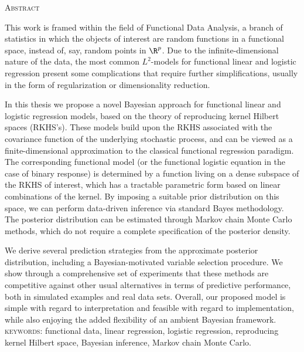%
%

\begin{center}
  \begin{Large}
  \textsc{Abstract}
\end{Large}
\end{center}

\noindent This work is framed within the field of Functional Data Analysis, a branch of statistics in which the objects of interest are random functions in a functional space, instead of, say, random points in \(\R^p\). Due to the infinite-dimensional nature of the data, the most common \(L^2\)-models for functional linear and logistic regression present some complications that require further simplifications, usually in the form of regularization or dimensionality reduction.

In this thesis we propose a novel Bayesian approach for functional linear and logistic regression models, based on the theory of reproducing kernel Hilbert spaces (RKHS's). These models build upon the RKHS associated with the covariance function of the underlying stochastic process, and can be viewed as a finite-dimensional approximation to the classical functional regression paradigm. The corresponding functional model (or the functional logistic equation in the case of binary response) is determined by a function living on a dense subspace of the RKHS of interest, which has a tractable parametric form based on linear combinations of the kernel. By imposing a suitable prior distribution on this space, we can perform data-driven inference via standard Bayes methodology. The posterior distribution can be estimated through Markov chain Monte Carlo methods, which do not require a complete specification of the posterior density.

We derive several prediction strategies from the approximate posterior distribution, including a Bayesian-motivated variable selection procedure. We show through a comprehensive set of experiments that these methods are competitive against other usual alternatives in terms of predictive performance, both in simulated examples and real data sets. Overall, our proposed model is simple with regard to interpretation and feasible with regard to implementation, while also enjoying the added flexibility of an ambient Bayesian framework.\\

\noindent
\textsc{keywords:} functional data, linear regression, logistic regression, reproducing kernel Hilbert space, Bayesian inference, Markov chain Monte Carlo.
